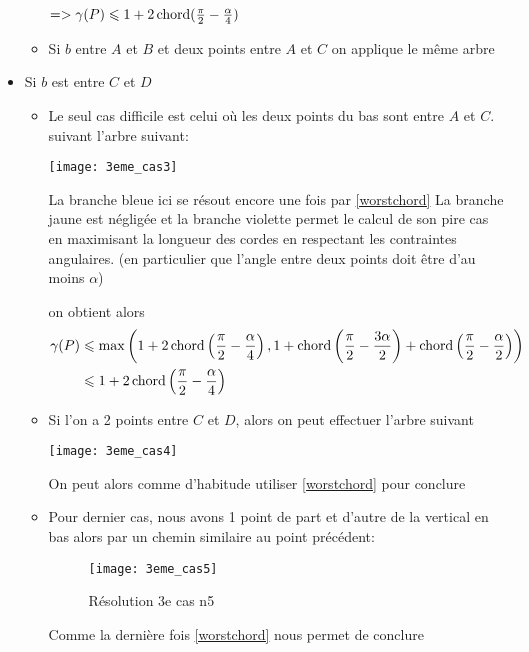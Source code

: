 \begin{itemize}
\begin{itemize}
$=> \gamma(P) \leqslant 1 + 2\operatorname{chord}(\frac{\pi}{2} - \frac{\alpha}{4})$

\item \label{3cas13} Si $b$ entre $A$ et $B$ et deux points entre $A$ et $C$ on applique le même arbre

\end{itemize}

\item \label{3cas2} Si $b$ est entre $C$ et $D$

\begin{itemize}

\item \label{3cas21} Le seul cas difficile est celui où les deux points du bas sont entre $A$ et $C$.
suivant l'arbre suivant:

  \texttt{[image: 3eme\_cas3]}

La branche bleue ici se résout encore une fois par \ref{worstchord}
La branche jaune est négligée
et la branche violette permet le calcul de son pire cas en maximisant la longueur des cordes en respectant les contraintes angulaires. (en particulier que l'angle entre deux points doit être d'au moins $\alpha$)

on obtient alors
\begin{align*}
\gamma(P) &\leqslant \max\left(1+2\operatorname{chord}\left(\frac{\pi}{2} - \frac{\alpha}{4}\right), 1 + \operatorname{chord}\left(\frac{\pi}{2} - \frac{3\alpha}{2}\right) + \operatorname{chord}\left(\frac{\pi}{2} - \frac{\alpha}{2}\right)\right) \\
&\leqslant 1+2\operatorname{chord}\left(\frac{\pi}{2} - \frac{\alpha}{4}\right)
\end{align*}

\item \label{3cas22} Si l'on a 2 points entre $C$ et $D$, alors on peut effectuer l'arbre suivant

  \texttt{[image: 3eme\_cas4]}

On peut alors comme d'habitude utiliser \ref{worstchord} pour conclure

\item \label{3cas23} Pour dernier cas, nous avons 1 point de part et d'autre de la vertical en bas alors par un chemin similaire au point précédent:

\begin{figure}[h!]
  \centering
  \texttt{[image: 3eme\_cas5]}
  \caption{Résolution 3e cas n5}
  \label{fig:3eme_cas5}
\end{figure}

Comme la dernière fois \ref{worstchord} nous permet de conclure

\end{itemize}
\end{itemize}

